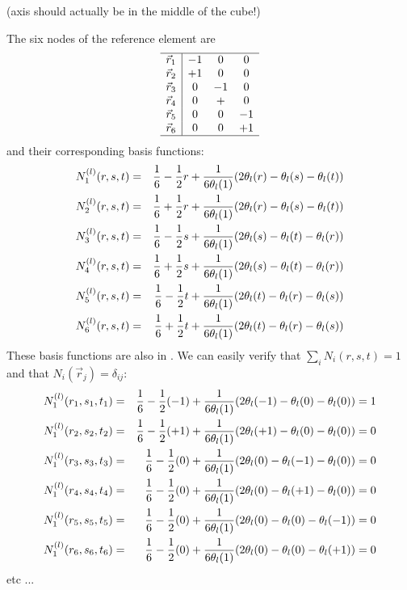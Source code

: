 

(axis should actually be in the middle of the cube!)

The six nodes of the reference element are 
\[
\begin{array}{c|ccc}
\hline
\vec{r}_1 &-1 &0 &0 \\
\vec{r}_2 &+1 &0 &0 \\
\vec{r}_3 &0 &-1 &0 \\
\vec{r}_4 &0 &+ &0 \\
\vec{r}_5 &0 &0 &-1 \\
\vec{r}_6 &0 &0 &+1 \\
\hline
\end{array}
\]
and their corresponding basis functions:
\begin{eqnarray}
N_1^{(l)}(r,s,t) &=&  \frac16 - \frac12 r + \frac{1}{6\theta_l(1)}(2\theta_l(r)-\theta_l(s)-\theta_l(t))  \nonumber\\
N_2^{(l)}(r,s,t) &=&  \frac16 + \frac12 r + \frac{1}{6\theta_l(1)}(2\theta_l(r)-\theta_l(s)-\theta_l(t))  \nonumber\\
N_3^{(l)}(r,s,t) &=&  \frac16 - \frac12 s + \frac{1}{6\theta_l(1)}(2\theta_l(s)-\theta_l(t)-\theta_l(r))  \nonumber\\
N_4^{(l)}(r,s,t) &=&  \frac16 + \frac12 s + \frac{1}{6\theta_l(1)}(2\theta_l(s)-\theta_l(t)-\theta_l(r))  \nonumber\\
N_5^{(l)}(r,s,t) &=&  \frac16 - \frac12 t + \frac{1}{6\theta_l(1)}(2\theta_l(t)-\theta_l(r)-\theta_l(s))  \nonumber\\
N_6^{(l)}(r,s,t) &=&  \frac16 + \frac12 t + \frac{1}{6\theta_l(1)}(2\theta_l(t)-\theta_l(r)-\theta_l(s))  
\end{eqnarray}
These basis functions are also in \cite{doss99}.
We can easily verify that $\sum_i N_i(r,s,t)=1$ and that $N_i(\vec{r}_j)=\delta_{ij}$:
\begin{eqnarray}
N_1^{(l)}(r_1,s_1,t_1) 
&=& \frac16 - \frac12 (-1) + \frac{1}{6\theta_l(1)}(2\theta_l(-1)-\theta_l(0) -\theta_l(0)) = 1 \nonumber\\ 
N_1^{(l)}(r_2,s_2,t_2) 
&=& \frac16 - \frac12 (+1) + \frac{1}{6\theta_l(1)}(2\theta_l(+1)-\theta_l(0) -\theta_l(0)) = 0 \nonumber\\ 
N_1^{(l)}(r_3,s_3,t_3) 
&=& \frac16 - \frac12 (0)  + \frac{1}{6\theta_l(1)}(2\theta_l(0) -\theta_l(-1)-\theta_l(0)) = 0 \nonumber\\ 
N_1^{(l)}(r_4,s_4,t_4) 
&=& \frac16 - \frac12 (0)  + \frac{1}{6\theta_l(1)}(2\theta_l(0) -\theta_l(+1)-\theta_l(0)) = 0\nonumber\\ 
N_1^{(l)}(r_5,s_5,t_5) 
&=& \frac16 - \frac12 (0)  + \frac{1}{6\theta_l(1)}(2\theta_l(0) -\theta_l(0) -\theta_l(-1)) = 0\nonumber\\ 
N_1^{(l)}(r_6,s_6,t_6) 
&=& \frac16 - \frac12 (0)  + \frac{1}{6\theta_l(1)}(2\theta_l(0) -\theta_l(0) -\theta_l(+1))  = 0\nonumber
\end{eqnarray}
etc ...



